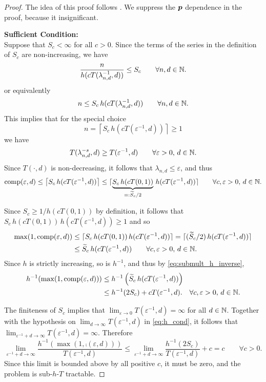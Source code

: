 \documentclass[11pt,a4paper]{article}
\begin{document}
\begin{proof}
The idea of this proof follows \cite{WW17}.
We suppress the $\boldsymbol{p}$ dependence in the proof, because it insignificant.

\bigskip

\noindent \textbf{Sufficient Condition:}\\
Suppose that $S_c <\infty$ for all $c>0$.  Since the terms of the series in the definition of $S_c$ are non-increasing, we have
	\[
		\frac{n}{h(cT(\lambda_{n,d}^{-1},d))}\le S_c \qquad \forall n,d \in \mathbb{N}.
	\]
or equivalently
\[
	n\le S_c \, h(cT(\lambda_{n,d}^{-1},d))   \qquad \forall n,d \in \mathbb{N}.
\]
This implies that for the special choice
\[
	n = \left\lceil
	S_c \, h(cT(\varepsilon^{-1},d))
	\right\rceil \ge 1
\]
	we have
	\[
	T(\lambda_{n,d}^{-s},d) \ge T(\varepsilon^{-1},d) \qquad \forall \varepsilon > 0, \, d \in \mathbb{N}.
	\]
Since $T(\cdot,d)$ is non-decreasing, it follows that $\lambda_{n,d} \le \varepsilon$, and thus
\[
\operatorname{comp}(\varepsilon,d) \le  \left\lceil
S_c \, h(cT(\varepsilon^{-1},d))
\right\rceil \le   \lceil \underbrace{
S_c \, h(cT(0,1))}_{=: \widetilde{S}_c/2} \, h(cT(\varepsilon^{-1},d))
\rceil\qquad \forall c, \varepsilon > 0, \, d \in \mathbb{N}.
\]

Since $S_c \ge 1/h(cT(0,1))$ by definition, it follows that $S_c \, h(cT(0,1)) \, h(cT(\varepsilon^{-1},d))  \ge 1$ and so
\begin{align*}
\max(1,\operatorname{comp}(\varepsilon,d))
& \le  \lceil  S_c \, h(cT(0,1)) \, h(cT(\varepsilon^{-1},d))   \rceil
 =  \lceil
(\widetilde{S}_c/2) \, h(cT(\varepsilon^{-1},d))
\rceil \\
& \le   \widetilde{S}_c \, h(cT(\varepsilon^{-1},d))
\qquad\forall c, \varepsilon > 0, \, d \in \mathbb{N}.
\end{align*}
Since $h$ is strictly increasing, so is $h^{-1}$, and thus by \eqref{eq:submult_h_inverse}, 
\begin{align*}
h^{-1}(\max(1,\operatorname{comp}(\varepsilon,d)) ) & \le  h^{-1} \left(
\widetilde{S}_c \, h(cT(\varepsilon^{-1},d))  \right)
\\
&  \le  h^{-1} (2 S_c) + cT (\varepsilon^{-1},d).
\quad \forall c, \varepsilon > 0, \, d \in \mathbb{N}.
\end{align*}

The finiteness of $S_c$ implies that $\lim_{\varepsilon \to 0} T(\varepsilon^{-1},d) = \infty$ for all $d \in \mathbb{N}$.  Together with  the hypothesis on $\lim_{d \to \infty} T(\varepsilon^{-1},d)$ in \eqref{eq:h_cond}, it follows that $\lim_{\varepsilon^{-1} + d \to \infty} T(\varepsilon^{-1},d) = \infty$.  Therefore
\begin{equation*}
	\lim_{\varepsilon^{-1} + d \to \infty} \frac{h^{-1}(\max(1,\comp(\varepsilon,d)))}{T(\varepsilon^{-1},d)}
	\le \lim_{\varepsilon^{-1} + d \to \infty} \frac{h^{-1} (2 S_c)}{T(\varepsilon^{-1},d)}  + c = c \qquad\forall c >  0.
\end{equation*}
Since this limit is bounded above by all positive $c$, it must be zero, and the problem is sub-$h$-$T$ tractable.



\end{proof}
\end{document}
